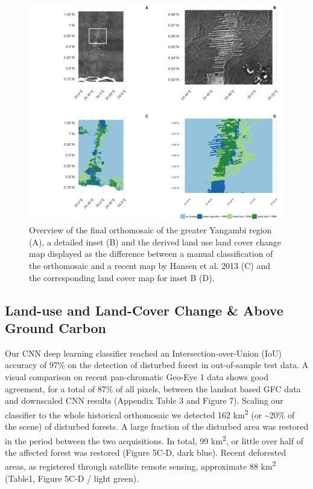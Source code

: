 \documentclass[remote sensing,article,submit,moreauthors,pdftex,10pt,a4paper]{mdpi}
\begin{document}
\begin{figure}
\includegraphics[width=1\linewidth]{./figures/orthomosaic_maps} \caption{Overview of the final orthomosaic of the greater Yangambi region (A), a detailed inset (B) and the derived land use land cover change map displayed as the difference between a manual classification of the orthomosaic and a recent map by Hansen et al. 2013 (C) and the corresponding land cover map for inset B (D).}\label{fig:unnamed-chunk-5}
\end{figure}

\hypertarget{land-use-and-land-cover-change-above-ground-carbon}{%
\subsection{Land-use and Land-Cover Change \& Above Ground
Carbon}\label{land-use-and-land-cover-change-above-ground-carbon}}

Our CNN deep learning classifier reached an Intersection-over-Union
(IoU) accuracy of 97\% on the detection of disturbed forest in
out-of-sample test data. A visual comparison on recent pan-chromatic
Geo-Eye 1 data shows good agreement, for a total of 87\% of all pixels,
between the landsat based GFC data and downscaled CNN results (Appendix
Table 3 and Figure 7). Scaling our classifier to the whole historical
orthomosaic we detected 162 km\textsuperscript{2} (or
\textasciitilde{}20\% of the scene) of disturbed forests. A large
fraction of the disturbed area was restored in the period between the
two acquisitions. In total, 99 km\textsuperscript{2}, or little over
half of the affected forest was restored (Figure 5C-D, dark blue).
Recent deforested areas, as registered through satellite remote sensing,
approximate 88 km\textsuperscript{2} (Table1, Figure 5C-D / light
green).
\end{document}
